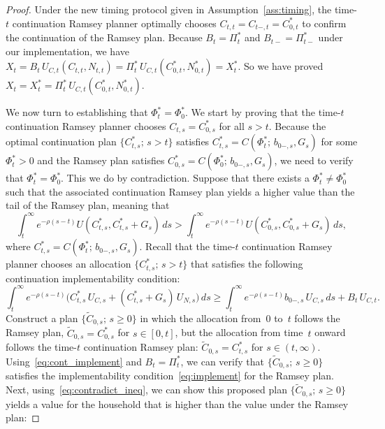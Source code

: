 \documentclass[12pt]{article}
\begin{document}
{\begin{proof}
	Under the new timing protocol given in Assumption~\ref{ass:timing}, the time-$t$ continuation Ramsey planner optimally chooses $C_{t,t} = C_{t-,t} = C_{0,t}^*$ to confirm the continuation of the Ramsey plan. Because $B_t = \Pi_t^*$ and $B_{t-} = \Pi_{t-}^*$ under our implementation, we have $X_t = B_t\, U_{C,t}(C_{t,t}, N_{t,t}) = \Pi_t^*\, U_{C,t}(C_{0,t}^*, N_{0,t}^*) = X_t^*$. So we have proved $X_t = X_t^* = \Pi_t^*\, U_{C,t}(C_{0,t}^*, N_{0,t}^*)$.
	
	{We now turn to establishing that $\Phi_t^* = \Phi_0^*$.} We start by  proving that the time-$t$ continuation Ramsey planner  chooses $C_{t,s} = C_{0,s}^*$ for all $s > t$. Because the optimal continuation plan $\{C_{t,s}^*;\, s > t\}$ satisfies $C_{t,s}^* = C(\Phi_t^*;\, b_{0-,s}, G_s)$ for some $\Phi_t^* > 0$ and the Ramsey plan satisfies $C_{0,s}^* = C(\Phi_0^*;\, b_{0-,s}, G_s)$, we need to verify that $\Phi_t^* = \Phi_0^*$.
	This we do by contradiction. Suppose that there exists a $\Phi_t^* \ne \Phi_0^*$ such that the associated  continuation Ramsey plan yields a higher value than the tail of the Ramsey plan, meaning that
	\begin{equation}\label{eq:contradict_ineq}
	\int_t^\infty e^{-\rho(s-t)} U(C_{t,s}^*, C_{t,s}^*+G_s)\, ds > \int_t^\infty e^{-\rho(s-t)} U(C_{0,s}^*, C_{0,s}^*+G_s)\, ds,
	\end{equation}
	where $C_{t,s}^* = C(\Phi_t^*;\, b_{0-,s}, G_s)$. Recall that the time-$t$ continuation Ramsey planner chooses an  allocation $\{C_{t,s}^*;\, s > t\}$ that satisfies the following continuation implementability condition:
	\begin{equation}\label{eq:cont_implement}
	\int_t^\infty e^{-\rho(s-t)}\bigl(C_{t,s}^*\, U_{C,s} + (C_{t,s}^*+G_s)\, U_{N,s}\bigr)\, ds \ge \int_t^\infty e^{-\rho(s-t)} b_{0-,s}\, U_{C,s}\, ds + B_t\, U_{C,t}.
	\end{equation}
	Construct a plan $\{\widetilde{C}_{0,s};\, s \ge 0\}$ in which  the allocation from~0 to~$t$ follows the Ramsey plan, $\widetilde{C}_{0,s} = C_{0,s}^*$ for $s \in [0,t]$, but the allocation from time~$t$ onward follows the time-$t$ continuation Ramsey plan: $\widetilde{C}_{0,s} = C_{t,s}^*$ for $s \in (t,\infty)$. Using~\eqref{eq:cont_implement} and $B_t = \Pi_t^*$, we can verify that $\{\widetilde{C}_{0,s};\, s \ge 0\}$ satisfies the implementability condition~\eqref{eq:implement} for the Ramsey plan. Next, using~\eqref{eq:contradict_ineq}, we can show this proposed plan $\{\widetilde{C}_{0,s};\, s \ge 0\}$ yields a value for the household that is higher than the value under the Ramsey plan:

\end{proof}}
\end{document}
